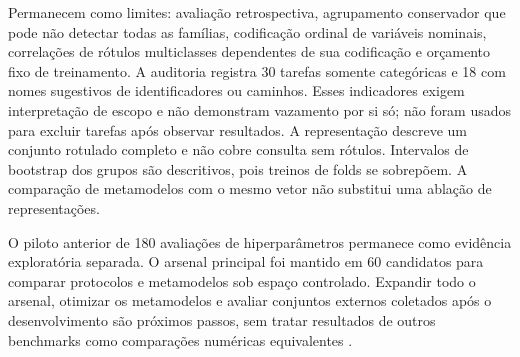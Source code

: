 Permanecem como limites: avaliação retrospectiva, agrupamento conservador que pode não detectar todas as famílias, codificação ordinal de variáveis nominais, correlações de rótulos multiclasses dependentes de sua codificação e orçamento fixo de treinamento. A auditoria registra 30 tarefas somente categóricas e 18 com nomes sugestivos de identificadores ou caminhos. Esses indicadores exigem interpretação de escopo e não demonstram vazamento por si só; não foram usados para excluir tarefas após observar resultados. A representação descreve um conjunto rotulado completo e não cobre consulta sem rótulos. Intervalos de bootstrap dos grupos são descritivos, pois treinos de folds se sobrepõem. A comparação de metamodelos com o mesmo vetor não substitui uma ablação de representações.

O piloto anterior de 180 avaliações de hiperparâmetros permanece como evidência exploratória separada. O arsenal principal foi mantido em 60 candidatos para comparar protocolos e metamodelos sob espaço controlado. Expandir todo o arsenal, otimizar os metamodelos e avaliar conjuntos externos coletados após o desenvolvimento são próximos passos, sem tratar resultados de outros benchmarks como comparações numéricas equivalentes \cite{Gijsbers2024,Baratchi2024}.
